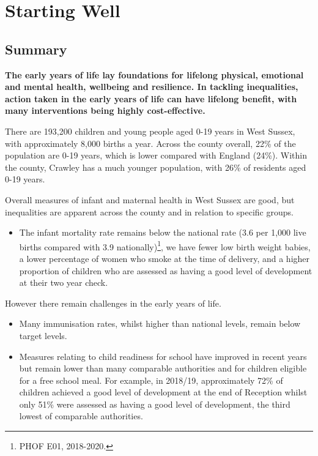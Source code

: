 \section{Starting Well}
\subsection{Summary}
{\bfseries The early years of life lay foundations for lifelong physical, emotional and mental health, wellbeing and resilience. In tackling inequalities, action taken in the early years of life can have lifelong benefit, with many interventions being highly cost-effective.

There are 193,200 children and young people aged 0-19 years in West Sussex, with approximately 8,000 births a year. Across the county overall, 22\% of the population are 0-19 years, which is lower compared with England (24\%). Within the county, Crawley has a much younger population, with 26\% of residents aged 0-19 years.}

Overall measures of infant and maternal health in West Sussex are good, but inequalities are apparent across the county and in relation to specific groups. 
\begin{itemize}
    \item The infant mortality rate remains below the national rate (3.6 per 1,000 live births compared with 3.9 nationally)\footnote{PHOF E01, 2018-2020.}, we have fewer low birth weight babies, a lower percentage of women who smoke at the time of delivery, and a higher proportion of children who are assessed as having a good level of development at their two year check. 
\end{itemize}

However there remain challenges in the early years of life. 

\begin{itemize}[noitemsep]
    \item Many immunisation rates, whilst higher than national levels, remain below target levels.
    \item Measures relating to child readiness for school have improved in recent years but remain lower than many comparable authorities and for children eligible for a free school meal. For example, in 2018/19, approximately 72\% of children achieved a good level of development at the end of Reception whilst only 51\% were assessed as having a good level of development, the third lowest of comparable authorities.
\end{itemize}

